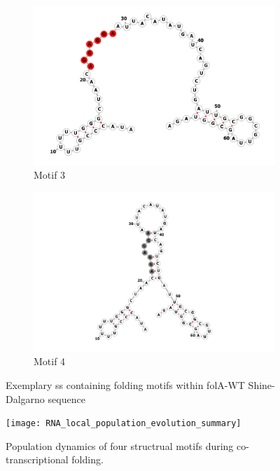 \documentclass[11pt, a4paper]{article}
\begin{document}
\begin{figure}
\begin{subfigure}[b]{0.475\textwidth}
    	\includegraphics[width=\textwidth]{folding_example_red}
   		\caption[]%
   		{{\small Motif 3}}    
    	\label{fig:mean and std of net34}
    \end{subfigure}
   	\quad
   	\begin{subfigure}[b]{0.475\textwidth}   
   		\centering 
    	\includegraphics[width=\textwidth]{folding_example_grey}
    	\caption[]%
   		{{\small Motif 4}}    
   		\label{fig:mean and std of net44}
   	\end{subfigure}
    \caption[ Exemplary ss containing folding motifs within folA-WT Shine-Dalgarno sequence ]
   	{\small Exemplary ss containing folding motifs within folA-WT Shine-Dalgarno sequence} 
   	\label{fig:local_foldings}
\end{figure}

\begin{figure}[tph]
\centering
\texttt{[image: RNA\_local\_population\_evolution\_summary]}
\caption[Population dynamics]{\small Population dynamics of four structrual motifs during co-transcriptional folding.}
\label{fig:populations}
\end{figure}
\end{document}
